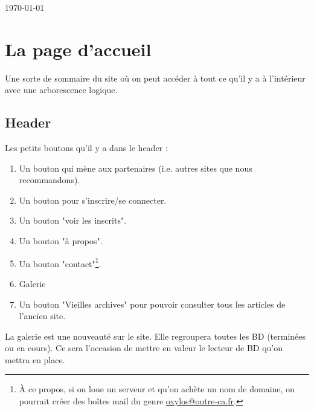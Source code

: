 \documentclass[french]{report}
\theoremstyle{plain}
\begin{document}
\begin{titlepage}
\begin{center}
	{\large   \today }






	\vfill



	\end{center}

	\end{titlepage}





	\pagebreak{}






	\tableofcontents





	\pagebreak



\chapter{La page d'accueil}
		Une sorte de sommaire du site où on peut accéder à tout ce qu'il y a à  l'intérieur avec une arborescence logique. 
		\section{Header}
			Les petits boutons qu'il y a dans le header :
			\begin{enumerate}
				\item Un bouton qui mène aux partenaires (i.e. autres sites que nous recommandons).
				\item Un bouton pour s'inscrire/se connecter.
				\item Un bouton "voir les inscrits".
				\item Un bouton "à propos".
				\item Un bouton "contact"\footnote{À ce propos, si on loue un serveur et qu'on achète un nom de domaine, on pourrait créer des boîtes mail du genre \href{mailto:oxylos@outre-ca.fr}{oxylos@outre-ca.fr}.}.
				\item Galerie
				\item Un bouton "Vieilles archives" pour pouvoir consulter tous les articles de l'ancien site.
			\end{enumerate}
			La galerie est une nouveauté sur le site. Elle regroupera toutes les BD (terminées ou en cours). Ce sera l'occasion de mettre en valeur le lecteur de BD qu'on mettra en place.
\end{document}
